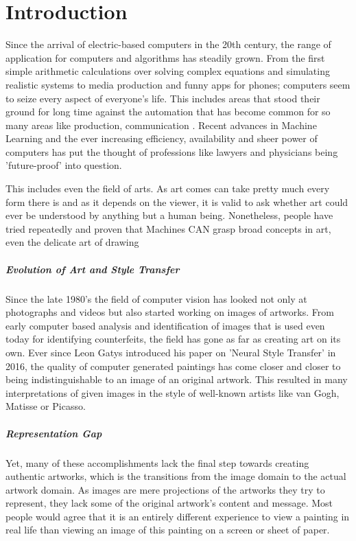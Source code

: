 \chapter{Introduction}

Since the arrival of electric-based computers in the 20th century, the range of 
application for computers and algorithms has steadily grown.
From the first simple arithmetic calculations over solving complex equations and simulating
realistic systems to media production and funny apps for phones; computers seem to
seize every aspect of everyone's life.
This includes areas that stood their ground for long time against the automation
that has become common for so many areas like production, communication \etc.
Recent advances in Machine Learning and the ever increasing efficiency, availability
and sheer power of computers has put the thought of professions like lawyers and physicians being
'future-proof' into question.

This includes even the field of arts.
As art comes can take pretty much every form there is and as it depends on the viewer,
it is valid to ask whether art could ever be understood by anything but a human being.
Nonetheless, people have tried repeatedly and proven that Machines CAN grasp broad
concepts in art, even the delicate art of drawing

\paragraph{Evolution of Art and Style Transfer}
Since the late 1980's the field of computer vision has looked not only at photographs
and videos but also started working on images of artworks.
From early computer based analysis and identification of images that is used even
today for identifying counterfeits, the field has gone as far as creating art on
its own.
Ever since Leon Gatys introduced his paper on 'Neural Style Transfer' in 2016, the quality
of computer generated paintings has come closer and closer to being indistinguishable to
an image of an original artwork.
This resulted in many interpretations of given images in the style of well-known
artists like van Gogh, Matisse or Picasso.

\paragraph{Representation Gap}
Yet, many of these accomplishments lack the final step towards creating authentic artworks,
which is the transitions from the image domain to the actual artwork domain.
As images are mere projections of the artworks they try to represent, they lack 
some of the original artwork's content and message.
Most people would agree that it is an entirely different experience to view a painting
in real life than viewing an image of this painting on a screen or sheet of paper.

